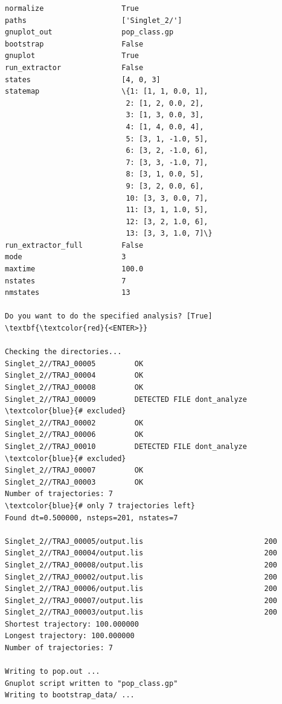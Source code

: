 \documentclass[a4paper,11pt,DIV=15,openany]{scrbook}
\begin{document}
\begin{oframed}
\begin{Verbatim}[commandchars=\\\{\}]
normalize                  True
paths                      ['Singlet_2/']
gnuplot_out                pop_class.gp
bootstrap                  False
gnuplot                    True
run_extractor              False
states                     [4, 0, 3]
statemap                   \{1: [1, 1, 0.0, 1], 
                            2: [1, 2, 0.0, 2], 
                            3: [1, 3, 0.0, 3], 
                            4: [1, 4, 0.0, 4], 
                            5: [3, 1, -1.0, 5], 
                            6: [3, 2, -1.0, 6], 
                            7: [3, 3, -1.0, 7], 
                            8: [3, 1, 0.0, 5], 
                            9: [3, 2, 0.0, 6], 
                            10: [3, 3, 0.0, 7], 
                            11: [3, 1, 1.0, 5], 
                            12: [3, 2, 1.0, 6], 
                            13: [3, 3, 1.0, 7]\}
run_extractor_full         False
mode                       3
maxtime                    100.0
nstates                    7
nmstates                   13

Do you want to do the specified analysis? [True] \textbf{\textcolor{red}{<ENTER>}}

Checking the directories...
Singlet_2//TRAJ_00005         OK
Singlet_2//TRAJ_00004         OK
Singlet_2//TRAJ_00008         OK
Singlet_2//TRAJ_00009         DETECTED FILE dont_analyze     \textcolor{blue}{# excluded}
Singlet_2//TRAJ_00002         OK
Singlet_2//TRAJ_00006         OK
Singlet_2//TRAJ_00010         DETECTED FILE dont_analyze     \textcolor{blue}{# excluded}
Singlet_2//TRAJ_00007         OK
Singlet_2//TRAJ_00003         OK
Number of trajectories: 7                                    \textcolor{blue}{# only 7 trajectories left}
Found dt=0.500000, nsteps=201, nstates=7

Singlet_2//TRAJ_00005/output.lis                            200
Singlet_2//TRAJ_00004/output.lis                            200
Singlet_2//TRAJ_00008/output.lis                            200
Singlet_2//TRAJ_00002/output.lis                            200
Singlet_2//TRAJ_00006/output.lis                            200
Singlet_2//TRAJ_00007/output.lis                            200
Singlet_2//TRAJ_00003/output.lis                            200
Shortest trajectory: 100.000000
Longest trajectory: 100.000000
Number of trajectories: 7

Writing to pop.out ...
Gnuplot script written to "pop_class.gp"
Writing to bootstrap_data/ ...
\end{Verbatim}
\end{oframed}
\end{document}
